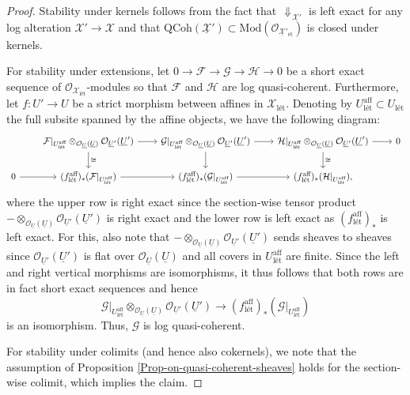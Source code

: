 \documentclass[10pt,a4paper]{amsart}
\DeclareMathOperator{\arrowdown}{\!\Downarrow\!}
\newcommand{\ul}[1]{\underline{#1}}
\begin{document}
\begin{proof}
Stability under kernels follows from the fact that $\arrowdown_{\mathcal{X}'}$ is left exact for any log alteration $\mathcal{X}'\rightarrow \mathcal{X}$ and that $\text{QCoh}(\underline{\mathcal{X}}')\subset \text{Mod}(\mathcal{O}_{\ul{\mathcal{X}}{}'_{\text{\'et}}})$ is closed under kernels.

For stability under extensions, let $0\rightarrow \mathcal{F}\rightarrow\mathcal{G}\rightarrow\mathcal{H}\rightarrow 0$ be a short exact sequence of $\mathcal{O}_{\mathcal{X}_{\text{l\'et}}}$-modules so that $\mathcal{F}$ and $\mathcal{H}$ are log quasi-coherent. Furthermore, let $f\colon U'\rightarrow U$ be a strict morphism between affines in $\mathcal{X}_{\text{l\'et}}$. Denoting by $U^{\text{aff}}_{\text{l\'et}}\subset U_{\text{l\'et}}$ the full subsite spanned by the affine objects, we have the following diagram: 
\begin{equation*}
\begin{tikzcd}[column sep=0.75cm]
            & \mathcal{F}|_{U_{\text{l\'et}}^{\text{aff}}}\otimes_{\mathcal{O}_{\ul{U}}(\ul{U})}\mathcal{O}_{\ul{U}'}(\ul{U}') \arrow[r] \arrow[d, "\cong"] & \mathcal{G}|_{U_{\text{l\'et}}^{\text{aff}}}\otimes_{\mathcal{O}_{\ul{U}}(\ul{U})}\mathcal{O}_{\ul{U}'}(\ul{U}') \arrow[r] \arrow[d] & \mathcal{H}|_{U_{\text{l\'et}}^{\text{aff}}}\otimes_{\mathcal{O}_{\ul{U}}(\ul{U})}\mathcal{O}_{\ul{U}'}(\ul{U}') \arrow[r] \arrow[d, "\cong"] & 0 \\
0 \arrow[r] & {(f_{\text{l\'et}}^{\text{aff}})_*(\mathcal{F}|_{U_{\text{l\'et}}^{\text{aff}}})} \arrow[r]                                                       & {(f_{\text{l\'et}}^{\text{aff}})_*(\mathcal{G}|_{U_{\text{l\'et}}^{\text{aff}}})} \arrow[r]                                              & {(f_{\text{l\'et}}^{\text{aff}})_*(\mathcal{H}|_{U_{\text{l\'et}}^{\text{aff}}})},                                                                 &  
\end{tikzcd}
\end{equation*}
where the upper row is right exact since the section-wise tensor product ${-}\otimes_{\mathcal{O}_{\ul{U}}(\ul{U})}\mathcal{O}_{\ul{U}'}(\ul{U}')$ is right exact and the lower row is left exact as $(f_{\text{l\'et}}^{\text{aff}})_*$ is left exact. For this, also note that ${-}\otimes_{\mathcal{O}_{\ul{U}}(\ul{U})}\mathcal{O}_{\ul{U}'}(\ul{U}')$ sends sheaves to sheaves since $\mathcal{O}_{\ul{U}'}(\ul{U}')$ is flat over $\mathcal{O}_{\ul{U}}(\ul{U})$ and all covers in $U^\text{aff}_{\text{l\'et}}$ are finite. Since the left and right vertical morphisms are isomorphisms, it thus follows that both rows are in fact short exact sequences and hence
$$\mathcal{G}|_{U_{\text{l\'et}}^{\text{aff}}}\otimes_{\mathcal{O}_{\ul{U}}(\ul{U})}\mathcal{O}_{\ul{U}'}(\ul{U}')\longrightarrow (f_{\text{l\'et}}^{\text{aff}})_*(\mathcal{G}|_{U_{\text{l\'et}}^{\text{aff}}})$$
is an isomorphism. Thus, $\mathcal{G}$ is log quasi-coherent.

For stability under colimits (and hence also cokernels), we note that the assumption of Proposition \ref{Prop-on-quasi-coherent-sheaves}
holds for the section-wise colimit, which implies the claim.
\end{proof}
\end{document}
